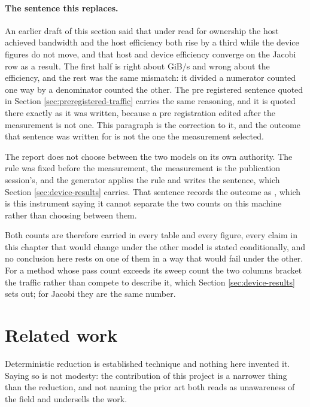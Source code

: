 \paragraph{The sentence this replaces.} An earlier draft of this section said
that under read for ownership the host achieved bandwidth and the host
efficiency both rise by a third while the device figures do not move, and that
host and device efficiency converge on the Jacobi row as a result. The first
half is right about GiB/s and wrong about the efficiency, and the rest was the
same mismatch: it divided a numerator counted one way by a denominator counted
the other. The pre registered sentence quoted in Section
\ref{sec:preregistered-traffic} carries the same reasoning, and it is quoted
there exactly as it was written, because a pre registration edited after the
measurement is not one. This paragraph is the correction to it, and the outcome
that sentence was written for is not the one the measurement selected.

The report does not choose between the two models on its own authority. The rule
was fixed before the measurement, the measurement is the publication session's,
and the generator applies the rule and writes the sentence, which Section
\ref{sec:device-results} carries. That sentence records the outcome as
\pnlTrafficModel{}, which is this instrument saying it cannot separate the two
counts on this machine rather than choosing between them.

Both counts are therefore carried in every table and every figure, every claim
in this chapter that would change under the other model is stated conditionally,
and no conclusion here rests on one of them in a way that would fail under the
other. For a method whose pass count exceeds its sweep count the two columns
bracket the traffic rather than compete to describe it, which Section
\ref{sec:device-results} sets out; for Jacobi they are the same number.

\section{Related work}
\label{sec:related-work}

Deterministic reduction is established technique and nothing here invented it.
Saying so is not modesty: the contribution of this project is a narrower thing
than the reduction, and not naming the prior art both reads as unawareness of
the field and undersells the work.

